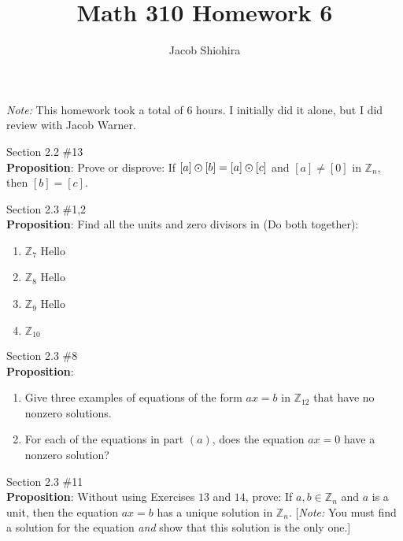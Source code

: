 \documentclass[12pt]{article}
\newcommand{\Z}{\mathbb{Z}}
\newenvironment{problem}[2][Problem]{\begin{trivlist}
\item[\hskip \labelsep {\bfseries #1}\hskip \labelsep {\bfseries #2.}]}{\end{trivlist}}
\begin{document}
\title{Math 310 Homework 6}
\author{Jacob Shiohira}
\maketitle

\noindent
\textit{Note:} This homework took a total of 6 hours. I initially did it alone, but I did review with Jacob Warner.

\begin{problem}{1} Section 2.2 \#13 \\

\noindent
\textbf{Proposition}: Prove or disprove: If $[a] \varodot [b] = [a] \varodot [c]$ and $[a] \neq [0]$ in $\Z_n$, then $[b] = [c]$.
\end{problem}

\begin{problem}{2} Section 2.3 \#1,2 \\

\noindent
\textbf{Proposition}: Find all the units and zero divisors in (Do both together): \\

\begin{enumerate} [label=(\alph*)]
\item $\Z_7$ Hello 
\item $\Z_8$ Hello 
\item $\Z_9$ Hello 
\item $\Z_10$
\end{enumerate}

\end{problem}

\begin{problem}{3} Section 2.3 \#8 \\

\noindent
\textbf{Proposition}: 
\begin{enumerate}[label=(\alph*)]
\item Give three examples of equations of the form $ax=b$ in $\Z_12$ that have no nonzero solutions.
\item For each of the equations in part $(a)$, does the equation $ax=0$ have a nonzero solution? 
\end{enumerate}
\end{problem}

\begin{problem}{4} Section 2.3 \#11 \\

\noindent
\textbf{Proposition}: Without using Exercises $13$ and $14$, prove: If $a,b \in \Z_n$ and $a$ is a unit, then the equation $ax=b$ has a unique solution in $\Z_n$. [\textit{Note:} You must find a solution for the equation \textit{and} show that this solution is the only one.]
\end{problem}
\end{document}
